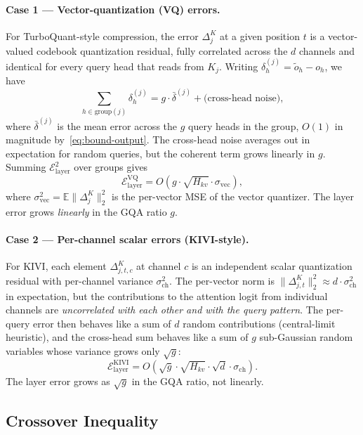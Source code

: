 \documentclass[11pt]{article}
\begin{document}
\paragraph{Case 1 — Vector-quantization (VQ) errors.}
For TurboQuant-style compression, the error $\Delta^K_j$ at a given position
$t$ is a vector-valued codebook quantization residual, fully correlated
across the $d$ channels and identical for every query head that reads from
$K_j$. Writing $\delta_h^{(j)} = \tilde o_h - o_h$, we have
\[
\sum_{h \in \mathrm{group}(j)} \delta_h^{(j)} = g \cdot \bar\delta^{(j)} + \text{(cross-head noise)},
\]
where $\bar\delta^{(j)}$ is the mean error across the $g$ query heads in the
group, $O(1)$ in magnitude by~\eqref{eq:bound-output}. The cross-head noise
averages out in expectation for random queries, but the coherent term grows
linearly in $g$. Summing $\mathcal{E}_{\mathrm{layer}}^2$ over groups gives
\begin{equation}
\label{eq:vq-scaling}
\mathcal{E}_{\mathrm{layer}}^{\mathrm{VQ}} = O\!\left( g \cdot \sqrt{H_{kv}} \cdot \sigma_{\mathrm{vec}} \right),
\end{equation}
where $\sigma_{\mathrm{vec}}^2 = \mathbb{E}\|\Delta^K_j\|_2^2$ is the
per-vector MSE of the vector quantizer. The layer error grows
\emph{linearly} in the GQA ratio $g$.

\paragraph{Case 2 — Per-channel scalar errors (KIVI-style).}
For KIVI, each element $\Delta^K_{j,t,c}$ at channel $c$ is an independent
scalar quantization residual with per-channel variance
$\sigma_{\mathrm{ch}}^2$. The per-vector norm is
$\|\Delta^K_{j,t}\|_2^2 \approx d \cdot \sigma_{\mathrm{ch}}^2$ in expectation,
but the contributions to the attention logit from individual channels are
\emph{uncorrelated with each other and with the query pattern}. The
per-query error then behaves like a sum of $d$ random contributions
(central-limit heuristic), and the cross-head sum behaves like a sum of $g$
sub-Gaussian random variables whose variance grows only $\sqrt{g}$:
\begin{equation}
\label{eq:kivi-scaling}
\mathcal{E}_{\mathrm{layer}}^{\mathrm{KIVI}} = O\!\left( \sqrt{g} \cdot \sqrt{H_{kv}} \cdot \sqrt{d} \cdot \sigma_{\mathrm{ch}} \right).
\end{equation}
The layer error grows as $\sqrt{g}$ in the GQA ratio, not linearly.

\subsection{Crossover Inequality}
\label{sec:theory-crossover}
\end{document}
